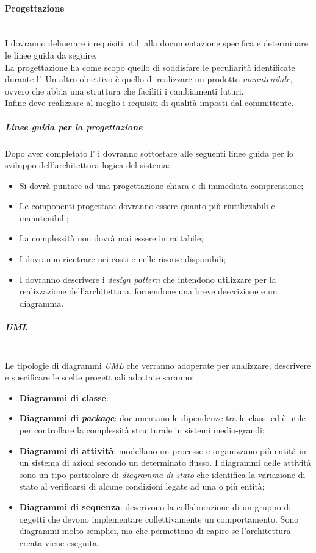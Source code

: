 \paragraph{Progettazione}
	~\\I \progs{} dovranno delinerare i requisiti utili alla documentazione specifica e determinare le linee guida da seguire.
	~\\La progettazione ha come scopo quello di soddisfare le peculiarità identificate durante l'\AdR. Un altro obiettivo è quello di realizzare un prodotto \emph{manutenibile}, ovvero che abbia una struttura che faciliti i cambiamenti futuri.
	\\Infine deve realizzare al meglio i requisiti di qualità imposti dal committente.
	\subparagraph{Linee guida per la progettazione}
	Dopo aver completato l'\AdR{} i \progs{} dovranno sottostare alle seguenti linee guida per lo sviluppo dell'architettura logica del sistema:
	\begin{itemize}
		\item Si dovrà puntare ad una progettazione chiara e di immediata comprensione;
		\item Le componenti progettate dovranno essere quanto più riutilizzabili e manutenibili;
		\item La complessità non dovrà mai essere intrattabile;
		\item I \progs{} dovranno rientrare nei costi e nelle risorse disponibili;
		\item I \progs{} dovranno descrivere i \emph{design pattern} che intendono utilizzare per la realizzazione dell'architettura, fornendone una breve descrizione e un diagramma.
	\end{itemize}
	\subparagraph{UML}
	~\\Le tipologie di diagrammi \emph{UML} che verranno adoperate per analizzare, descrivere e specificare le scelte progettuali adottate saranno:
	\begin{itemize}
		\item \textbf{Diagrammi di classe}:
		\item \textbf{Diagrammi di } \emph{\textbf{package}}: documentano le dipendenze tra le classi ed è utile per controllare la complessità strutturale in sistemi medio-grandi;
		\item \textbf{Diagrammi di attività}: modellano un processo e organizzano più entità in un sistema di azioni secondo un determinato flusso. I diagrammi delle attività sono un tipo particolare di \emph{diagramma di stato} che identifica la variazione di stato al verificarsi di alcune condizioni legate ad una o più entità;
		\item \textbf{Diagrammi di sequenza}: descrivono la collaborazione di un gruppo di oggetti che devono implementare collettivamente un comportamento. Sono diagrammi molto semplici, ma che permettono di capire se l'architettura creata viene eseguita.
	\end{itemize}

